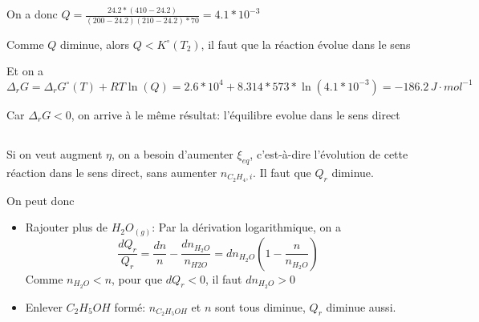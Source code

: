 \documentclass[a4paper,12pt]{book}
\begin{document}
\hspace*{\fill} 

On a donc $Q=\frac{24.2*(410-24.2)}{(200-24.2)(210-24.2)*70}=4.1*10^{-3}$

\hspace*{\fill} 

Comme $Q$ diminue, alors $Q<K^\circ(T_2)$, il faut que la réaction évolue dans le sens 

\hspace*{\fill} 

Et on a $\boxed{\Delta_rG=\Delta_r G^{\circ}(T)+RT\ln(Q)=2.6*10^{4}+8.314*573*\ln(4.1*10^{-3})=-186.2\,J\cdot mol^{-1}}$

\hspace*{\fill} 

Car $\Delta_rG<0$, on arrive à le même résultat: l'équilibre evolue dans le sens direct
\subsection{}
Si on veut augment $\eta$, on a besoin d'aumenter $\xi_{eq}$, c'est-à-dire l'évolution de cette réaction dans le sens direct, 
sans aumenter $n_{C_2H_4,i}$. Il faut que $Q_r$ diminue.

On peut donc 
\begin{itemize}
    \item Rajouter plus de $H_2O_{(g)}$: Par la dérivation logarithmique, on a 
    $$\frac{dQ_r}{Q_r}=\frac{dn}{n}-\frac{dn_{H_2O}}{n_{H2O}}=dn_{H_2O}\left(1-\frac{n}{n_{H_2O}}\right)$$
    Comme $n_{H_2O}<n$, pour que $dQ_r<0$, il faut $\boxed{dn_{H_2O}>0}$ 
    \item Enlever $C_2H_5OH$ formé: $n_{C_2H_5OH}$ et $n$ sont tous diminue, $Q_r$ diminue aussi.
\end{itemize}
\end{document}
